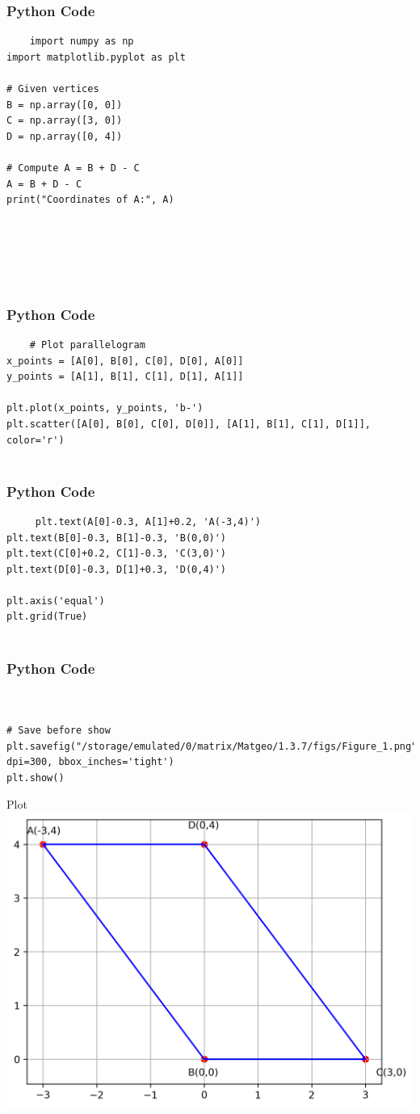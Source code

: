 \documentclass{beamer}
\begin{document}
\begin{frame}[fragile]
    \frametitle{Python Code}
    \begin{lstlisting}
    import numpy as np
import matplotlib.pyplot as plt

# Given vertices
B = np.array([0, 0])
C = np.array([3, 0])
D = np.array([0, 4])

# Compute A = B + D - C
A = B + D - C
print("Coordinates of A:", A)






    \end{lstlisting}
\end{frame}

\begin{frame}[fragile]
    \frametitle{Python Code}
    \begin{lstlisting}
    # Plot parallelogram
x_points = [A[0], B[0], C[0], D[0], A[0]]
y_points = [A[1], B[1], C[1], D[1], A[1]]

plt.plot(x_points, y_points, 'b-')
plt.scatter([A[0], B[0], C[0], D[0]], [A[1], B[1], C[1], D[1]], color='r')


    \end{lstlisting}
\end{frame}

\begin{frame}[fragile]
    \frametitle{Python Code}
    \begin{lstlisting}
     plt.text(A[0]-0.3, A[1]+0.2, 'A(-3,4)')
plt.text(B[0]-0.3, B[1]-0.3, 'B(0,0)')
plt.text(C[0]+0.2, C[1]-0.3, 'C(3,0)')
plt.text(D[0]-0.3, D[1]+0.3, 'D(0,4)')

plt.axis('equal')
plt.grid(True)


    \end{lstlisting}
\end{frame}


\begin{frame}[fragile]
    \frametitle{Python Code}
    \begin{lstlisting}


# Save before show
plt.savefig("/storage/emulated/0/matrix/Matgeo/1.3.7/figs/Figure_1.png", dpi=300, bbox_inches='tight')
plt.show()
    \end{lstlisting}
\end{frame}


\begin{frame}{Plot}
    \centering
    \includegraphics[width=\columnwidth, height=0.8\textheight, keepaspectratio]{figs/figure_1.png}     
\end{frame}
\end{document}
